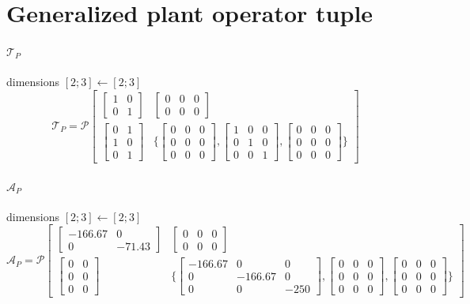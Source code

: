 \documentclass{article}
\newcommand{\PIop}[6]{\mathcal P\!\left[\begin{array}{c|c}#1&#2\\\hline#3&\{#4,#5,#6\}\end{array}\right]}
\begin{document}
\section*{Generalized plant operator tuple}
\paragraph{$\mathcal T_P$}\hfill dimensions $[2;3]\leftarrow[2;3]$
\[\displaystyle \mathcal T_P=\PIop{\begin{bmatrix}1 & 0\\0 & 1\end{bmatrix}}{\begin{bmatrix}0 & 0 & 0\\0 & 0 & 0\end{bmatrix}}{\begin{bmatrix}0 & 1\\1 & 0\\0 & 1\end{bmatrix}}{\begin{bmatrix}0 & 0 & 0\\0 & 0 & 0\\0 & 0 & 0\end{bmatrix}}{\begin{bmatrix}1 & 0 & 0\\0 & 1 & 0\\0 & 0 & 1\end{bmatrix}}{\begin{bmatrix}0 & 0 & 0\\0 & 0 & 0\\0 & 0 & 0\end{bmatrix}}\]
\paragraph{$\mathcal A_P$}\hfill dimensions $[2;3]\leftarrow[2;3]$
\[\displaystyle \mathcal A_P=\PIop{\begin{bmatrix}-166.67 & 0\\0 & -71.43\end{bmatrix}}{\begin{bmatrix}0 & 0 & 0\\0 & 0 & 0\end{bmatrix}}{\begin{bmatrix}0 & 0\\0 & 0\\0 & 0\end{bmatrix}}{\begin{bmatrix}-166.67 & 0 & 0\\0 & -166.67 & 0\\0 & 0 & -250\end{bmatrix}}{\begin{bmatrix}0 & 0 & 0\\0 & 0 & 0\\0 & 0 & 0\end{bmatrix}}{\begin{bmatrix}0 & 0 & 0\\0 & 0 & 0\\0 & 0 & 0\end{bmatrix}}\]
\end{document}
